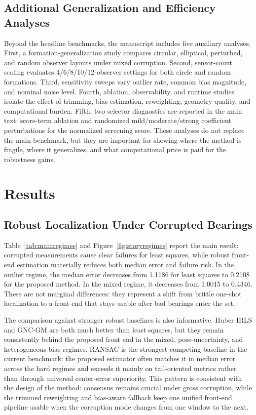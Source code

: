 \documentclass[drones,article,submit,pdftex,moreauthors]{Definitions/mdpi}
\begin{document}
\subsection{Additional Generalization and Efficiency Analyses}

Beyond the headline benchmarks, the manuscript includes five auxiliary analyses. First, a formation-generalization study compares circular, elliptical, perturbed, and random observer layouts under mixed corruption. Second, sensor-count scaling evaluates 4/6/8/10/12-observer settings for both circle and random formations. Third, sensitivity sweeps vary outlier rate, common bias magnitude, and nominal noise level. Fourth, ablation, observability, and runtime studies isolate the effect of trimming, bias estimation, reweighting, geometry quality, and computational burden. Fifth, two selector diagnostics are reported in the main text: score-term ablation and randomized mild/moderate/strong coefficient perturbations for the normalized screening score. These analyses do not replace the main benchmark, but they are important for showing where the method is fragile, where it generalizes, and what computational price is paid for the robustness gains.

\section{Results}

\subsection{Robust Localization Under Corrupted Bearings}

Table~\ref{tab:mainregimes} and Figure~\ref{fig:storyregimes} report the main result: corrupted measurements cause clear failures for least squares, while robust front-end estimation materially reduces both median error and failure risk. In the outlier regime, the median error decreases from 1.1186 for least squares to 0.2108 for the proposed method. In the mixed regime, it decreases from 1.0015 to 0.4346. These are not marginal differences: they represent a shift from brittle one-shot localization to a front-end that stays usable after bad bearings enter the set.



The comparison against stronger robust baselines is also informative. Huber IRLS and GNC-GM are both much better than least squares, but they remain consistently behind the proposed front end in the mixed, pose-uncertainty, and heterogeneous-bias regimes. RANSAC is the strongest competing baseline in the current benchmark: the proposed estimator often matches it in median error across the hard regimes and exceeds it mainly on tail-oriented metrics rather than through universal center-error superiority. This pattern is consistent with the design of the method: consensus remains crucial under gross corruption, while the trimmed reweighting and bias-aware fallback keep one unified front-end pipeline usable when the corruption mode changes from one window to the next.
\end{document}
